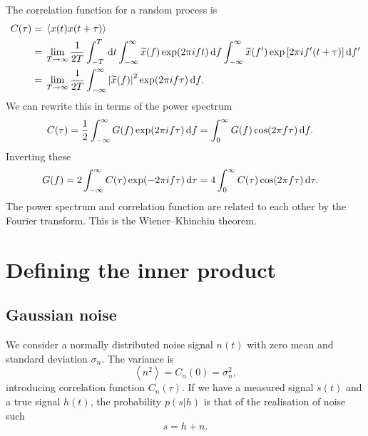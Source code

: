The correlation function for a random process is
\begin{align}
C(\tau) = {} & \left\langle x(t)x(t + \tau)\right\rangle \\
 = {} & \lim_{T \rightarrow \infty} \frac{1}{2T} \int_{-T}^{T}\,\mathrm{d} t \int_{-\infty}^{\infty}{\widetilde{x}(f)\exp(2\pi ift)}\,\mathrm{d}{f} \int_{-\infty}^{\infty}{\widetilde{x}(f')\exp\left[2\pi if'(t + \tau)\right]}\,\mathrm{d}{f'} \nonumber \\
 = {} & \lim_{T \rightarrow \infty} \frac{1}{2T} \int_{-\infty}^{\infty}{\left|\widetilde{x}(f)\right|^2\exp(2\pi if\tau)}\,\mathrm{d}{f}.
\end{align}
We can rewrite this in terms of the power spectrum
\begin{align}
C(\tau) = {} & \frac{1}{2} \int_{-\infty}^{\infty}{G(f)\exp(2\pi if\tau)}\,\mathrm{d}{f} = \int_{0}^{\infty}{G(f)\cos(2\pi f\tau)}\,\mathrm{d}{f}.
\end{align}
Inverting these
\begin{align}
G(f) = {} & 2 \int_{-\infty}^{\infty}{C(\tau)\exp(-2\pi i f\tau)}\,\mathrm{d}{\tau} = 4 \int_{0}^{\infty}{C(\tau) \cos(2\pi f\tau)}\,\mathrm{d}{\tau}.
\end{align}
The power spectrum and correlation function are related to each other by the Fourier transform. This is the Wiener--Khinchin theorem.

\section{Defining the inner product}

\subsection{Gaussian noise}

We consider a normally distributed noise signal $n(t)$ with zero mean and standard deviation $\sigma_n$. The variance is
\begin{equation}
\left\langle n^2 \right\rangle = C_n(0) = \sigma_n^2,
\end{equation}
introducing correlation function $C_n(\tau)$. If we have a measured signal $s(t)$ and a true signal $h(t)$, the probability $p(s|h)$ is that of the realisation of noise such
\begin{equation}
s = h + n.
\end{equation}

